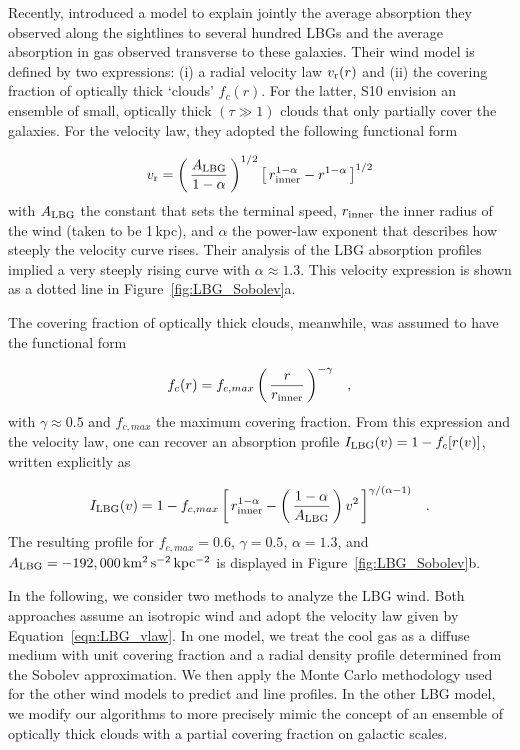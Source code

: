 \documentclass[12pt,preprint]{aastex}
\begin{document}
Recently, \citet[][hereafter S10]{steidel+10} introduced a model to
explain jointly the average absorption they observed
along the sightlines to several hundred LBGs and the average absorption in gas
observed transverse to these galaxies.  
Their wind model is defined by two
expressions: (i) a radial velocity law $v_{\rm r}(r)$ and (ii) the covering
fraction of optically thick `clouds' $f_c(r)$.  For the latter, S10
envision an 
ensemble of small, optically thick $(\tau \gg 1)$ clouds that only
partially cover the galaxies.
For the velocity law, they adopted the following functional
form

\begin{equation}
v_{\rm r} = \left ( \, \frac{A_{\rm LBG}}{1-\alpha} \, \right )^{1/2} \left [ \, r_{\rm
  inner}^{1-\alpha} - r^{1-\alpha} \, \right ]^{1/2}
\label{eqn:LBG_vlaw}
\end{equation}
with $A_{\rm LBG}$ the constant that sets the terminal speed,
$r_{\rm inner}$ the inner radius of the wind (taken to be 1\,kpc), and
$\alpha$ the power-law exponent that describes how steeply the velocity curve rises.  Their
analysis of the LBG absorption profiles implied
a very steeply rising curve with $\alpha \approx 1.3$.
This velocity expression is shown as a dotted line in 
Figure~\ref{fig:LBG_Sobolev}a.  

The covering fraction of optically thick clouds, meanwhile, was assumed to have
the functional form

\begin{equation}
f_c(r) = f_{c,max} \left ( \, \frac{r}{r_{\rm inner}} \, \right )^{-\gamma} \;\;\; ,
\label{eqn:covering}
\end{equation}
with $\gamma \approx 0.5$ and $f_{c,max}$ the maximum covering
fraction.  From this expression and the velocity law, one can recover
an absorption profile $I_{\rm LBG}(v) = 1 - f_c[r(v)]$, written
explicitly as

\begin{equation}
I_{\rm LBG}(v) = 1 - f_{c,max} \left [ \, r_{\rm inner}^{1-\alpha} - \left ( \,
\frac{1-\alpha}{A_{\rm LBG}} \, \right ) v^2 \, \right ]^{\gamma/(\alpha-1)}
\;\;\; .
\label{eqn:LBG_I}
\end{equation}
The resulting profile for $f_{c,max} = 0.6$, $\gamma=0.5$,
$\alpha=1.3$, and $A_{\rm LBG} = -192,000 \, \rm km^2 \, s^{-2} \, kpc^{-2}$ 
is displayed in Figure~\ref{fig:LBG_Sobolev}b.  

In the following, we consider two methods to analyze the LBG wind.
Both approaches assume an isotropic wind and adopt the velocity law given by
Equation~\ref{eqn:LBG_vlaw}.  In one model, we treat the cool gas as a
diffuse medium with unit covering fraction and a radial density
profile determined from the Sobolev approximation.  We then apply 
the Monte Carlo methodology used for the other wind models to predict
 and  line profiles.  In the other LBG model,
we modify our algorithms to more precisely mimic the concept of an
ensemble of optically thick clouds with a partial covering fraction on
galactic scales.
\end{document}
